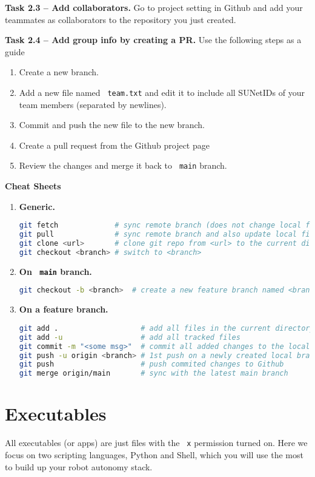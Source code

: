 \documentclass{article}
\def\code#1{\texttt{\color{magenta} #1}}
\begin{document}
{\bf Task 2.3 -- Add collaborators.} Go to project setting in Github and add your teammates
as collaborators to the repository you just created.

{\bf Task 2.4 -- Add group info by creating a PR.} Use the following steps as a guide
\begin{enumerate}
  \item Create a new branch.
  \item Add a new file named \code{team.txt} and edit it to include all SUNetIDs of
    your team members (separated by newlines).
  \item Commit and push the new file to the new branch.
  \item Create a pull request from the Github project page
  \item Review the changes and merge it back to \code{main} branch.
\end{enumerate}

{\bf Cheat Sheets}
\begin{enumerate}
\item {\bf Generic.}
\begin{lstlisting}[language=sh]
git fetch             # sync remote branch (does not change local files)
git pull              # sync remote branch and also update local files
git clone <url>       # clone git repo from <url> to the current directory
git checkout <branch> # switch to <branch>
\end{lstlisting}

\item {\bf On \code{main} branch.}
\begin{lstlisting}[language=sh]
git checkout -b <branch>  # create a new feature branch named <branch>
\end{lstlisting}

\item {\bf On a feature branch.}
\begin{lstlisting}[language=sh]
git add .                   # add all files in the current directory
git add -u                  # add all tracked files
git commit -m "<some msg>"  # commit all added changes to the local branch
git push -u origin <branch> # 1st push on a newly created local branch
git push                    # push commited changes to Github
git merge origin/main       # sync with the latest main branch
\end{lstlisting}
\end{enumerate}

\section{Executables}
All executables (or apps) are just files with the \code{x} permission turned on. Here
we focus on two scripting languages, Python and Shell, which you will use the most
to build up your robot autonomy stack.
\end{document}
